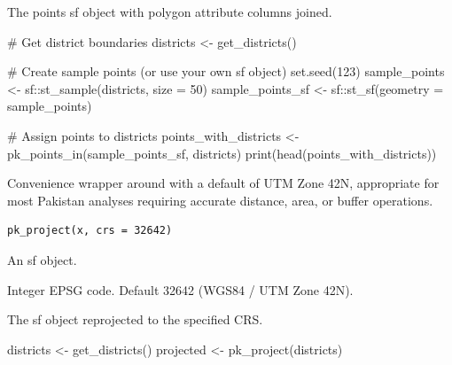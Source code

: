 \documentclass[a4paper]{book}
\begin{document}
%
\begin{Value}
The points sf object with polygon attribute columns joined.
\end{Value}
%
\begin{Examples}
\begin{ExampleCode}

  # Get district boundaries
  districts <- get_districts()

  # Create sample points (or use your own sf object)
  set.seed(123)
  sample_points <- sf::st_sample(districts, size = 50)
  sample_points_sf <- sf::st_sf(geometry = sample_points)

  # Assign points to districts
  points_with_districts <- pk_points_in(sample_points_sf, districts)
  print(head(points_with_districts))

\end{ExampleCode}
\end{Examples}
%
\begin{Description}
Convenience wrapper around  with a default
of UTM Zone 42N, appropriate for most Pakistan analyses requiring
accurate distance, area, or buffer operations.
\end{Description}
%
\begin{Usage}
\begin{verbatim}
pk_project(x, crs = 32642)
\end{verbatim}
\end{Usage}
%
\begin{Arguments}
\begin{ldescription}
\item[\code{x}] An sf object.

\item[\code{crs}] Integer EPSG code. Default 32642 (WGS84 / UTM Zone 42N).
\end{ldescription}
\end{Arguments}
%
\begin{Value}
The sf object reprojected to the specified CRS.
\end{Value}
%
\begin{Examples}
\begin{ExampleCode}

  districts <- get_districts()
  projected <- pk_project(districts)

\end{ExampleCode}
\end{Examples}
\end{document}
